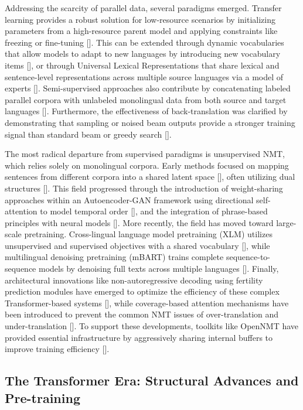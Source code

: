 \documentclass[11pt]{article}
\begin{document}
Addressing the scarcity of parallel data, several paradigms emerged. Transfer learning provides a robust solution for low-resource scenarios by initializing parameters from a high-resource parent model and applying constraints like freezing or fine-tuning [\citep{1604.02201}]. This can be extended through dynamic vocabularies that allow models to adapt to new languages by introducing new vocabulary items [\citep{1811.01137}], or through Universal Lexical Representations that share lexical and sentence-level representations across multiple source languages via a model of experts [\citep{1802.05368}]. Semi-supervised approaches also contribute by concatenating labeled parallel corpora with unlabeled monolingual data from both source and target languages [\citep{1606.04596}]. Furthermore, the effectiveness of back-translation was clarified by demonstrating that sampling or noised beam outputs provide a stronger training signal than standard beam or greedy search [\citep{1808.09381}].

The most radical departure from supervised paradigms is unsupervised NMT, which relies solely on monolingual corpora. Early methods focused on mapping sentences from different corpora into a shared latent space [\citep{1711.00043}], often utilizing dual structures [\citep{1710.11041}]. This field progressed through the introduction of weight-sharing approaches within an Autoencoder-GAN framework using directional self-attention to model temporal order [\citep{1804.09057}], and the integration of phrase-based principles with neural models [\citep{1804.07755}]. More recently, the field has moved toward large-scale pretraining. Cross-lingual language model pretraining (XLM) utilizes unsupervised and supervised objectives with a shared vocabulary [\citep{1901.07291}], while multilingual denoising pretraining (mBART) trains complete sequence-to-sequence models by denoising full texts across multiple languages [\citep{2001.08210}]. Finally, architectural innovations like non-autoregressive decoding using fertility prediction modules have emerged to optimize the efficiency of these complex Transformer-based systems [\citep{1711.02281}], while coverage-based attention mechanisms have been introduced to prevent the common NMT issues of over-translation and under-translation [\citep{1601.04811}]. To support these developments, toolkits like OpenNMT have provided essential infrastructure by aggressively sharing internal buffers to improve training efficiency [\citep{1701.02810}].

\subsection{The Transformer Era: Structural Advances and Pre-training}
\end{document}
